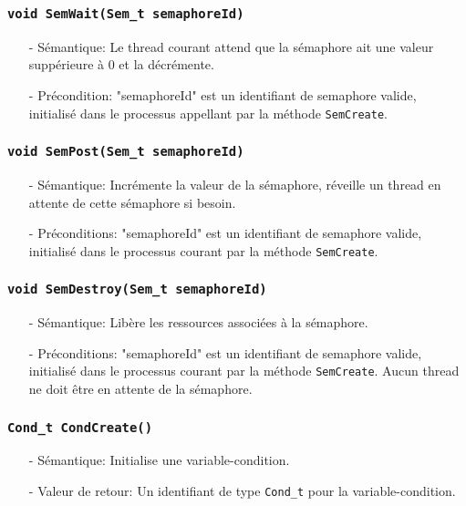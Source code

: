 \documentclass[11pt]{article}
\theoremstyle{definition}
\theoremstyle{definition}
\begin{document}
\subsubsection{\texttt{void SemWait(Sem\_t semaphoreId)}}
\begin{itemize}
\item[-]Sémantique: Le thread courant attend que la sémaphore ait une valeur suppérieure à $0$
  et la décrémente.
\item[-]Précondition: "semaphoreId" est un identifiant de semaphore valide, initialisé dans le processus
  appellant par la méthode \texttt{SemCreate}.
\end{itemize}

\subsubsection{\texttt{void SemPost(Sem\_t semaphoreId)}}
\begin{itemize}
\item[-]Sémantique: Incrémente la valeur de la sémaphore, réveille un thread en attente de cette sémaphore
  si besoin.
\item[-]Préconditions: "semaphoreId" est un identifiant de semaphore valide, initialisé dans le processus
  courant par la méthode \texttt{SemCreate}.
\end{itemize}

\subsubsection{\texttt{void SemDestroy(Sem\_t semaphoreId)}}
\begin{itemize}
\item[-]Sémantique: Libère les ressources associées à la sémaphore.
\item[-]Préconditions: "semaphoreId" est un identifiant de semaphore valide, initialisé dans le processus
  courant par la méthode \texttt{SemCreate}. Aucun thread ne doit être en attente de la sémaphore.
\end{itemize}

\subsubsection{\texttt{Cond\_t CondCreate()}}
\begin{itemize}
\item[-]Sémantique: Initialise une variable-condition.
\item[-]Valeur de retour: Un identifiant de type \texttt{Cond\_t} pour la variable-condition.
\end{itemize}
\end{document}
